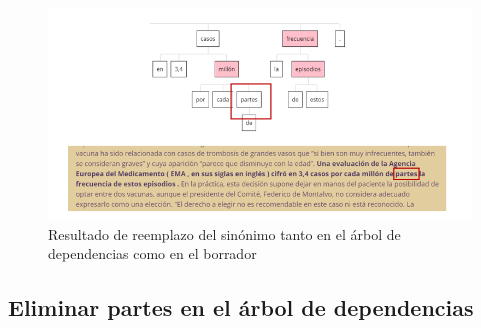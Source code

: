 \begin{figure}[h!]
	\centering
	
	
	\includegraphics[scale=1.3]{Imagenes/Figuras/CambioSinonimoArbolBorrador}
	
	
	\caption{Resultado de reemplazo del sinónimo tanto en el árbol de dependencias como en el borrador}
	\label{fig:resultadoSinonimos}
\end{figure}
\subsection{Eliminar partes en el árbol de dependencias}

